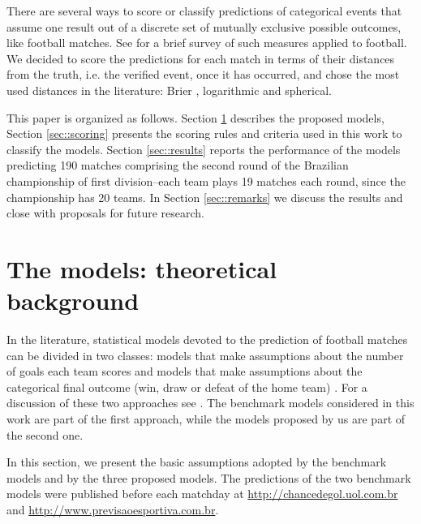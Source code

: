 \documentclass[journal,article,accept,moreauthors,pdftex,12pt,a4paper]{mdpi}
\begin{document}
    There are several ways to score or classify predictions of categorical events that assume one result out of a discrete set of mutually exclusive possible outcomes, like football matches.
    See \cite{constantinou} for a brief survey of such measures applied to football.
    We decided to score the predictions for each match in terms of their distances from the truth, i.e. the verified event, once it has occurred, and chose the most used distances in the literature: Brier \cite{brier1950}, logarithmic and spherical.

    This paper is organized as follows.
    Section \ref{sec::experimental} describes the proposed models, Section \ref{sec::scoring} presents the scoring rules and criteria used in this work to classify the models.
    Section \ref{sec::results} reports the performance of the models predicting 190 matches comprising the second round of the Brazilian championship of first division--each team plays 19 matches each round, since the championship has 20 teams.
    In Section \ref{sec::remarks} we discuss the results and close with proposals for future research.



    \section{The models: theoretical background}
    \label{sec::experimental}

    In the literature, statistical models devoted to the prediction of
    football matches can be divided in two classes: models that make
    assumptions about the number of goals each team scores
    \citep{Maher82, Dixon97, Lee97, Karlis2003} and models that make
    assumptions about the categorical final outcome (win, draw or defeat
    of the home team) \citep{Forrest2000, Koning2000, Brillinger2008,
        Brillinger2009}. For a discussion of these two approaches see
    \cite{Goddard2005}. The benchmark models considered in this work are
    part of the first approach, while the models proposed by us are part
    of the second one.

    In this section, we present the basic assumptions adopted by the benchmark models and
    by the three proposed models. The predictions of the
    two benchmark models were published before each matchday at
    \url{http://chancedegol.uol.com.br} and
    \url{http://www.previsaoesportiva.com.br}.
\end{document}
